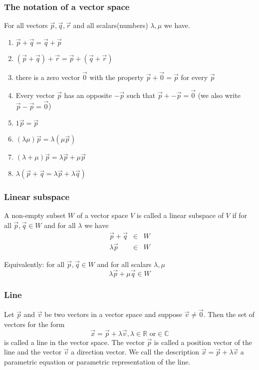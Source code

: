 \documentclass{article}
\begin{document}
			\subsubsection{The notation of a vector space}
			For all vectors $\vec{p}, \vec{q}, \vec{r}$ and all scalars(numbers) $\lambda, \mu$ we have.
			\begin{enumerate}
				\item $\vec{p} + \vec{q} = \vec{q} + \vec{p}$
				\item $(\vec{p}+\vec{q}) + \vec{r} = \vec{p} + (\vec{q} + \vec{r})$
				\item there is a zero vector $\vec{0}$ with the property $\vec{p}+\vec{0} = \vec{p}$ for every $\vec{p}$
				\item Every vector $\vec{p}$ has an opposite $-\vec{p}$ such that $\vec{p} + -\vec{p} = \vec{0}$ (we also write $\vec{p} - \vec{p}= \vec{0}$)
				\item $1\vec{p} = \vec{p}$
				\item $(\lambda\mu)\vec{p} = \lambda(\mu\vec{p})$
				\item $(\lambda + \mu)\vec{p} = \lambda\vec{p} + \mu\vec{p}$
				\item $\lambda(\vec{p} + \vec{q} = \lambda\vec{p} + \lambda\vec{q})$
			\end{enumerate}
			\subsubsection{Linear subspace}
			A non-empty subset $W$ of a vector space $V$ is called a linear subspace of $V$ if for all $\vec{p},\vec{q} \in W$ and for all $\lambda$ we have
			\begin{eqnarray*}
				\vec{p} + \vec{q} &\in& W\\
				\lambda\vec{p} &\in& W
			\end{eqnarray*}
		
			Equivalently: for all $\vec{p},\vec{q} \in W$ and for all scalars $\lambda, \mu$
			\begin{equation*}
				\lambda\vec{p} + \mu\vec{q} \in W
			\end{equation*}
			
			\subsubsection{Line}
			Let $\vec{p}$ and $\vec{v}$ be two vectors in a vector space and suppose $\vec{v} \neq \vec{0}$. Then the set of vectors for the form
			\begin{equation*}
				\vec{x} = \vec{p} + \lambda\vec{v}, \lambda \in \mathbb{R} \text{ or} \in \mathbb{C}
			\end{equation*}
			is called a line in the vector space. The vector $\vec{p}$ is called a position vector of the line and the vector $\vec{v}$ a direction vector. We call the description $\vec{x} = \vec{p} + \lambda\vec{v}$ a parametric equation or parametric representation of the line.
			
\end{document}
